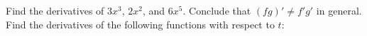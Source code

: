 \begin{questions}
  \questioA Find the derivatives of $ 3x^3 $, $ 2x^2 $, and $ 6x^5 $. Conclude that $ (fg)' \neq f' g' $ in general.
  \questioA Find the derivatives of the following functions with respect to $ t $:
\end{questions}

